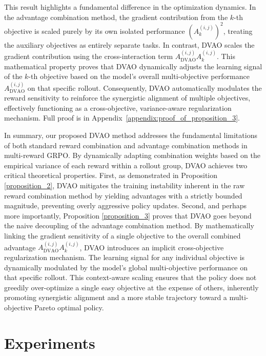 \documentclass{llmxive}
\begin{document}
This result highlights a fundamental difference in the optimization dynamics. In the advantage combination method, the gradient contribution from the $k$-th objective is scaled purely by its own isolated performance $\left(A_k^{(i,j)}\right)^2$, treating the auxiliary objectives as entirely separate tasks. In contrast, DVAO scales the gradient contribution using the cross-interaction term $A_\text{DVAO}^{(i,j)} A_k^{(i,j)}$. This mathematical property proves that DVAO dynamically adjusts the learning signal of the $k$-th objective based on the model's overall multi-objective performance $A_\text{DVAO}^{(i,j)}$ on that specific rollout. Consequently, DVAO automatically modulates the reward sensitivity to reinforce the synergistic alignment of multiple objectives, effectively functioning as a cross-objective, variance-aware regularization mechanism. Full proof is in Appendix~\ref{appendix:proof_of_proposition_3}.

In summary, our proposed DVAO method addresses the fundamental limitations of both standard reward combination and advantage combination methods in multi-reward GRPO. By dynamically adapting combination weights based on the empirical variance of each reward within a rollout group, DVAO achieves two critical theoretical properties. First, as demonstrated in Proposition \ref{proposition_2}, DVAO mitigates the training instability inherent in the raw reward combination method by yielding advantages with a strictly bounded magnitude, preventing overly aggressive policy updates. Second, and perhaps more importantly, Proposition \ref{proposition_3} proves that DVAO goes beyond the naive decoupling of the advantage combination method. By mathematically linking the gradient sensitivity of a single objective to the overall combined advantage $A_\text{DVAO}^{(i,j)} A_k^{(i,j)}$, DVAO introduces an implicit cross-objective regularization mechanism. The learning signal for any individual objective is dynamically modulated by the model's global multi-objective performance on that specific rollout. This context-aware scaling ensures that the policy does not greedily over-optimize a single easy objective at the expense of others, inherently promoting synergistic alignment and a more stable trajectory toward a multi-objective Pareto optimal policy.
 
\section{Experiments}
\end{document}
